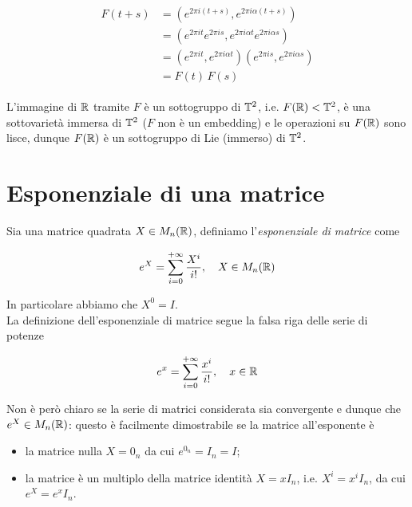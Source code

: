 \begin{align}
	\begin{split}
		F(t+s) &= (e^{2 \pi i (t+s)},e^{2 \pi i \alpha (t+s)}) \\
		&= (e^{2 \pi i t} e^{2 \pi i s},e^{2 \pi i \alpha t} e^{2 \pi i \alpha s}) \\
		&= (e^{2 \pi i t},e^{2 \pi i \alpha t}) (e^{2 \pi i s},e^{2 \pi i \alpha s}) \\
		&= F(t) \, F(s)
	\end{split}
\end{align}

L'immagine di $ \mathbb{R} $ tramite $ F $ è un sottogruppo di $ \mathbb{T}^{2} $, i.e. $ F(\mathbb{R}) < \mathbb{T}^{2} $, è una sottovarietà immersa di $ \mathbb{T}^{2} $ ($ F $ non è un embedding) e le operazioni su $ F(\mathbb{R}) $ sono lisce, dunque $ F(\mathbb{R}) $ è un sottogruppo di Lie (immerso) di $ \mathbb{T}^{2} $.

\section{Esponenziale di una matrice}

Sia una matrice quadrata $ X \in M_{n}(\mathbb{R}) $, definiamo l'\textit{esponenziale di matrice} come

\begin{equation}
	e^{X} = \sum_{i=0}^{+\infty} \dfrac{X^{i}}{i!} \qcomma X \in M_{n}(\R)
\end{equation}

In particolare abbiamo che $ X^{0} = I $.\\
La definizione dell'esponenziale di matrice segue la falsa riga delle serie di potenze

\begin{equation}
	e^{x} = \sum_{i=0}^{+\infty} \dfrac{x^{i}}{i!} \qcomma x \in \R
\end{equation}

Non è però chiaro se la serie di matrici considerata sia convergente e dunque che $ e^{X} \in M_{n}(\mathbb{R}) $: questo è facilmente dimostrabile se la matrice all'esponente è

\begin{itemize}
	\item la matrice nulla $ X = 0_{n} $ da cui $ e^{0_{n}} = I_{n} = I $;
	
	\item la matrice è un multiplo della matrice identità $ X = x I_{n} $, i.e. $ X^{i} = x^{i} I_{n} $, da cui $ e^{X} = e^{x} I_{n} $.
\end{itemize}

